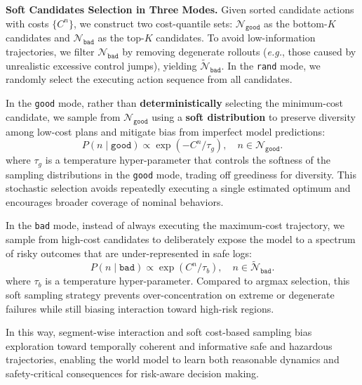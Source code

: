 \documentclass[twocolumn]{template}
\theoremstyle{thmstyleone}%
\theoremstyle{thmstyletwo}%
\theoremstyle{thmstylethree}%
\begin{document}
\noindent
\textbf{Soft Candidates Selection in Three Modes.}
Given sorted candidate actions with costs $\{C^n\}$, we construct two cost-quantile sets: $\mathcal{N}_{\texttt{good}}$ as the bottom-$K$ candidates and $\mathcal{N}_{\texttt{bad}}$ as the top-$K$ candidates.
To avoid low-information trajectories,
we filter $\mathcal{N}_{\texttt{bad}}$ by removing degenerate rollouts (\textit{e.g.}, those caused by unrealistic excessive control jumps),
yielding $\tilde{\mathcal{N}}_{\texttt{bad}}$. In the \texttt{rand} mode, we randomly select the executing action sequence from all candidates.

In the \texttt{good} mode, rather than \textbf{deterministically} selecting the minimum-cost candidate, we sample from $\mathcal{N}_{\texttt{good}}$ using a \textbf{soft distribution} to preserve diversity among low-cost plans and mitigate bias from imperfect model predictions:
\begin{equation}
P(n \mid \texttt{good}) \propto \exp(-C^n/\tau_g), \quad n \in \mathcal{N}_{\texttt{good}}.
\end{equation}
where $\tau_g$ is a temperature hyper-parameter that controls the softness of the sampling distributions in the \texttt{good} mode, trading off greediness for diversity.
This stochastic selection avoids repeatedly executing a single estimated optimum and encourages broader coverage of nominal behaviors.

In the \texttt{bad} mode,
instead of always executing the maximum-cost trajectory,
we sample from high-cost candidates to deliberately expose the model to a spectrum of risky outcomes that are under-represented in safe logs:
\begin{equation}
P(n \mid \texttt{bad}) \propto \exp(C^n/\tau_b), \quad n \in \tilde{\mathcal{N}}_{\texttt{bad}}.
\end{equation}
where $\tau_b$ is a temperature hyper-parameter.
Compared to argmax selection, this soft sampling strategy prevents over-concentration on extreme or degenerate failures while still biasing interaction toward high-risk regions.

In this way, segment-wise interaction and soft cost-based sampling bias exploration toward temporally coherent and informative safe and hazardous trajectories, enabling the world model to learn both reasonable dynamics and safety-critical consequences for risk-aware decision making.
\end{document}
